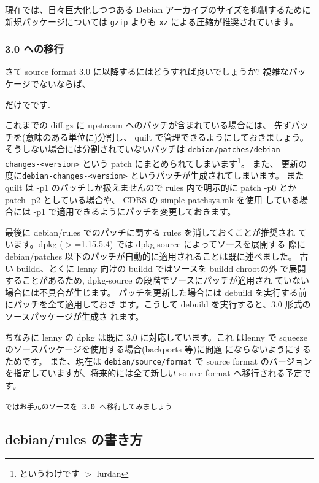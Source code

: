 \documentclass[mingoth,a4paper]{jsarticle}
\begin{document}
現在では、日々巨大化しつつある  Debian アーカイブのサイズを抑制するために
新規パッケージについては {\tt gzip} よりも {\tt xz} による圧縮が推奨されています。

\subsubsection{3.0 への移行}

さて source format 3.0 に以降するにはどうすれば良いでしょうか? 
複雑なパッケージでないならば、
\begin{commandline}
\end{commandline}
だけでです. 

これまでの diff.gz に upstream へのパッチが含まれている場合には、
先ずパッチを(意味のある単位に)分割し、
quilt で管理できるようにしておきましょう。
そうしない場合には分割されていないパッチは
{\tt debian/patches/debian-changes-<version>} という
patch にまとめられてしまいます\footnote{というわけです $>$ lurdan}。
また、
更新の度に{\tt debian-changes-<version>} というパッチが生成されてしまいます。
%
また quilt は -p1 のパッチしか扱えませんので rules 内で明示的に patch
-p0 とか patch -p2 としている場合や、 CDBS の simple-patchsys.mk を使用
している場合には -p1 で適用できるようにパッチを変更しておきます。

最後に debian/rules でのパッチに関する rules を消しておくことが推奨され
ています。dpkg ($>$=1.15.5.4) では dpkg-source によってソースを展開する
際にdebian/patches 以下のパッチが自動的に適用されることは既に述べました。
古い buildd、とくに lenny 向けの buildd ではソースを buildd chrootの外
で展開することがあるため, dpkg-source の段階でソースにパッチが適用され
ていない場合には不具合が生じます。
%
パッチを更新した場合には debuild を実行する前にパッチを全て適用しておき
ます。こうして debuild を実行すると、3.0 形式のソースパッケージが生成さ
れます。

ちなみに lenny の dpkg は既に 3.0 に対応しています。これ
はlenny で squeeze のソースパッケージを使用する場合(backports 等)に問題
にならないようにするためです。 また、現在は {\tt debian/source/format}
で source format のバージョンを指定していますが、将来的には全て新しい
source format へ移行される予定です。
\begin{center}
    {\tt ではお手元のソースを 3.0 へ移行してみましょう}    
\end{center}

\subsection{debian/rules の書き方}
\end{document}
